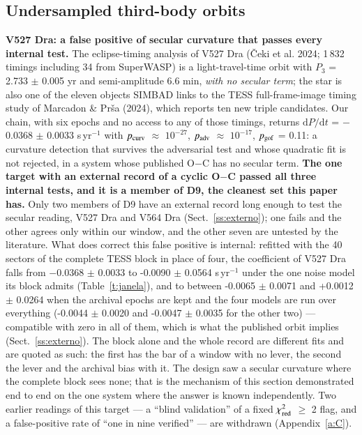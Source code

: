 \documentclass{aa}
\begin{document}
\subsection{Undersampled third-body orbits}\label{ss:orb}
\textbf{V527 Dra: a false positive of secular curvature that passes every internal test.} The eclipse-timing analysis of V527 Dra (Čeki et al. 2024; 1\,832 timings including 34 from SuperWASP) is a light-travel-time orbit with $P_3$ = 2.733 $\pm$ 0.005 yr and semi-amplitude 6.6 min, \textit{with no secular term}; the star is also one of the eleven objects SIMBAD links to the TESS full-frame-image timing study of Marcadon \& Prša (2024), which reports ten new triple candidates. Our chain, with six epochs and no access to any of those timings, returns $\mathrm{d}P/\mathrm{d}t$ = $-$0.0368 $\pm$ 0.0033 s\,yr$^{-1}$ with $p_{\rm curv}$ $\approx$ $10^{-27}$, $p_{\rm adv}$ $\approx$ $10^{-17}$, $p_{\rm gof}$ = 0.11: a curvature detection that survives the adversarial test and whose quadratic fit is not rejected, in a system whose published O$-$C has no secular term. \textbf{The one target with an external record of a cyclic O$-$C passed all three internal tests, and it is a member of D9, the cleanest set this paper has.} Only two members of D9 have an external record long enough to test the secular reading, V527 Dra and V564 Dra (Sect.~\ref{ss:externo}); one fails and the other agrees only within our window, and the other seven are untested by the literature. What does correct this false positive is internal: refitted with the 40 sectors of the complete TESS block in place of four, the coefficient of V527 Dra falls from $-$0.0368 $\pm$ 0.0033 to -0.0090 $\pm$ 0.0564 s\,yr$^{-1}$ under the one noise model its block admits (Table~\ref{t:janela}), and to between -0.0065 $\pm$ 0.0071 and +0.0012 $\pm$ 0.0264 when the archival epochs are kept and the four models are run over everything (-0.0044 $\pm$ 0.0020 and -0.0047 $\pm$ 0.0035 for the other two) --- compatible with zero in all of them, which is what the published orbit implies (Sect.~\ref{ss:externo}). The block alone and the whole record are different fits and are quoted as such: the first has the bar of a window with no lever, the second the lever and the archival bias with it. The design saw a secular curvature where the complete block sees none; that is the mechanism of this section demonstrated end to end on the one system where the answer is known independently. Two earlier readings of this target --- a ``blind validation'' of a fixed $\chi^2_{\rm red}$ $\ge$ 2 flag, and a false-positive rate of ``one in nine verified'' --- are withdrawn (Appendix~\ref{a:C}).
\end{document}
